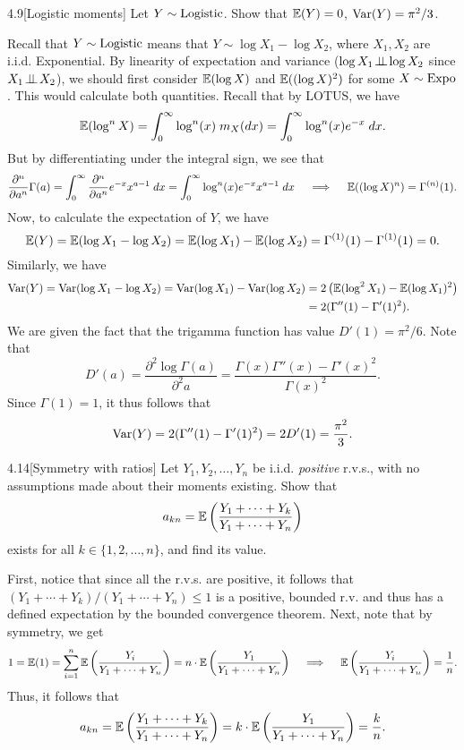 \documentclass{pset}
\begin{document}
\begin{problem}{4.9}[Logistic moments]
  Let $Y\sim \textrm{Logistic}$. Show that $\mathbb{E}(Y) = 0$, $\textrm{Var}(Y) = \pi^2/3$.
\end{problem}

\begin{solution}
  Recall that $Y \sim \textrm{Logistic}$ means that $Y\sim \log X_1 - \log X_2$, where $X_1, X_2$ are i.i.d. Exponential. By linearity of expectation and variance ($\log X_1 \!\perp\!\!\!\perp\! \log X_2$ since $X_1\!\perp\!\!\!\perp\! X_2$), we should first consider $\mathbb{E}(\log X)$ and $\mathbb{E}((\log X)^2)$ for some $X\sim \textrm{Expo}$. This would calculate both quantities. Recall that by LOTUS, we have
  \[
    \mathbb{E}(\log^n X) = \int_{0}^\infty \log^n(x)\; m_X(dx) = \int_0^\infty \log^n(x)e^{-x}\;dx.
  \]
  But by differentiating under the integral sign, we see that
  \[
    \frac{\partial^n}{\partial a^n}\Gamma(a) = \int^\infty_0 \frac{\partial^n}{\partial a^n} e^{-x} x^{a-1}\;dx = \int^\infty_0 \log^n(x) e^{-x}x^{a-1}\;dx \quad\implies\quad \mathbb{E}((\log X)^n) = \Gamma^{(n)}(1).
  \]
  Now, to calculate the expectation of $Y$, we have
  \[
    \mathbb{E}(Y) = \mathbb{E}(\log X_1 - \log X_2) = \mathbb{E}(\log X_1) - \mathbb{E}(\log X_2) = \Gamma^{(1)}(1) - \Gamma^{(1)}(1) = 0.
  \]
  Similarly, we have
  \[
    \begin{aligned}
      \textrm{Var}(Y) = \textrm{Var}(\log X_1 - \log X_2) = \textrm{Var}(\log X_1) - \textrm{Var}(\log X_2) &= 2\left(\mathbb{E}(\log^2 X_1)-\mathbb{E}(\log X_1)^2\right)\\
      &= 2(\Gamma''(1) - \Gamma'(1)^2).
    \end{aligned}
  \]
  We are given the fact that the trigamma function has value $D'(1) = \pi^2/6$. Note that
  \[
    D'(a) = \frac{\partial^2 \log \Gamma(a)}{\partial^2 a} = \frac{\Gamma(x)\Gamma''(x) - \Gamma'(x)^2}{\Gamma(x)^2}.
  \]
  Since $\Gamma(1)=1$, it thus follows that
  \[
    \textrm{Var}(Y) = 2(\Gamma''(1) - \Gamma'(1)^2) = 2D'(1) = \frac{\pi^2}{3}.
  \]
\end{solution}

\begin{problem}{4.14}[Symmetry with ratios]
  Let $Y_1, Y_2, \ldots, Y_n$ be i.i.d. \emph{positive} r.v.s., with no assumptions made about their moments existing. Show that
  \[a_{kn}= \mathbb{E}\left(\frac{Y_1 + \cdots +Y_k}{Y_1+\cdots +Y_n}\right)\]
  exists for all $k\in \{1,2,\ldots, n\}$, and find its value.
\end{problem}

\begin{solution}
  First, notice that since all the r.v.s. are positive, it follows that $(Y_1+\cdots+Y_k) / (Y_1 + \cdots + Y_n)\leq 1$ is a positive, bounded r.v. and thus has a defined expectation by the bounded convergence theorem. Next, note that by symmetry, we get
  \[
    1=\mathbb{E}(1)=\sum_{i=1}^n\mathbb{E}\left(\frac{Y_i}{Y_1+\cdots+Y_n}\right) = n\cdot\mathbb{E}\left(\frac{Y_1}{Y_1+\cdots+Y_n}\right)\quad\implies\quad \mathbb{E}\left(\frac{Y_i}{Y_1+\cdots+Y_n}\right) = \frac{1}{n}.
  \]
  Thus, it follows that
  \[
    a_{kn}=\mathbb{E}\left(\frac{Y_1+\cdots+Y_k}{Y_1+\cdots+Y_n}\right) = k\cdot\mathbb{E}\left(\frac{Y_1}{Y_1+\cdots+Y_n}\right) = \frac{k}{n}.
  \]
\end{solution}
\end{document}
